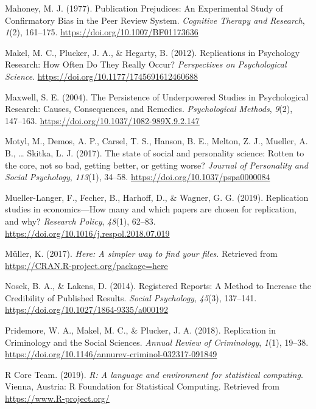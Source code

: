 \documentclass[british,,man,floatsintext]{apa6}
\begin{document}
\leavevmode\hypertarget{ref-Mahoney1977}{}%
Mahoney, M. J. (1977). Publication Prejudices: An Experimental Study of Confirmatory Bias in the Peer Review System. \emph{Cognitive Therapy and Research}, \emph{1}(2), 161--175. \url{https://doi.org/10.1007/BF01173636}

\leavevmode\hypertarget{ref-Makel2012}{}%
Makel, M. C., Plucker, J. A., \& Hegarty, B. (2012). Replications in Psychology Research: How Often Do They Really Occur? \emph{Perspectives on Psychological Science}. \url{https://doi.org/10.1177/1745691612460688}

\leavevmode\hypertarget{ref-Maxwell2004}{}%
Maxwell, S. E. (2004). The Persistence of Underpowered Studies in Psychological Research: Causes, Consequences, and Remedies. \emph{Psychological Methods}, \emph{9}(2), 147--163. \url{https://doi.org/10.1037/1082-989X.9.2.147}

\leavevmode\hypertarget{ref-Motyl2017}{}%
Motyl, M., Demos, A. P., Carsel, T. S., Hanson, B. E., Melton, Z. J., Mueller, A. B., \ldots{} Skitka, L. J. (2017). The state of social and personality science: Rotten to the core, not so bad, getting better, or getting worse? \emph{Journal of Personality and Social Psychology}, \emph{113}(1), 34--58. \url{https://doi.org/10.1037/pspa0000084}

\leavevmode\hypertarget{ref-Mueller-Langer2019}{}%
Mueller-Langer, F., Fecher, B., Harhoff, D., \& Wagner, G. G. (2019). Replication studies in economics---How many and which papers are chosen for replication, and why? \emph{Research Policy}, \emph{48}(1), 62--83. \url{https://doi.org/10.1016/j.respol.2018.07.019}

\leavevmode\hypertarget{ref-R-here}{}%
Müller, K. (2017). \emph{Here: A simpler way to find your files}. Retrieved from \url{https://CRAN.R-project.org/package=here}

\leavevmode\hypertarget{ref-Nosek2014}{}%
Nosek, B. A., \& Lakens, D. (2014). Registered Reports: A Method to Increase the Credibility of Published Results. \emph{Social Psychology}, \emph{45}(3), 137--141. \url{https://doi.org/10.1027/1864-9335/a000192}

\leavevmode\hypertarget{ref-Pridemore2018}{}%
Pridemore, W. A., Makel, M. C., \& Plucker, J. A. (2018). Replication in Criminology and the Social Sciences. \emph{Annual Review of Criminology}, \emph{1}(1), 19--38. \url{https://doi.org/10.1146/annurev-criminol-032317-091849}

\leavevmode\hypertarget{ref-R-base}{}%
R Core Team. (2019). \emph{R: A language and environment for statistical computing}. Vienna, Austria: R Foundation for Statistical Computing. Retrieved from \url{https://www.R-project.org/}
\end{document}
